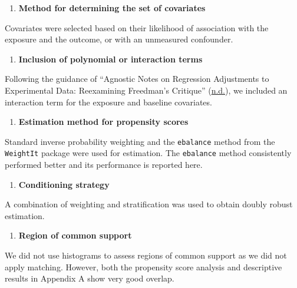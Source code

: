 \documentclass[
  singlecolumn]{report}
\providecommand{\tightlist}{%
  \setlength{\itemsep}{0pt}\setlength{\parskip}{0pt}}\usepackage{longtable,booktabs,array}
\begin{document}
\begin{enumerate}
\def\labelenumi{\arabic{enumi}.}
\setcounter{enumi}{2}
\tightlist
\item
  \textbf{Method for determining the set of covariates}
\end{enumerate}

Covariates were selected based on their likelihood of association with
the exposure and the outcome, or with an unmeasured confounder.

\begin{enumerate}
\def\labelenumi{\arabic{enumi}.}
\setcounter{enumi}{3}
\tightlist
\item
  \textbf{Inclusion of polynomial or interaction terms}
\end{enumerate}

Following the guidance of {``Agnostic Notes on Regression Adjustments to
Experimental Data: Reexamining Freedman{'}s Critique''}
(\protect\hyperlink{ref-agnostic}{n.d.}), we included an interaction
term for the exposure and baseline covariates.

\begin{enumerate}
\def\labelenumi{\arabic{enumi}.}
\setcounter{enumi}{4}
\tightlist
\item
  \textbf{Estimation method for propensity scores}
\end{enumerate}

Standard inverse probability weighting and the \texttt{ebalance} method
from the \texttt{WeightIt} package were used for estimation. The
\texttt{ebalance} method consistently performed better and its
performance is reported here.

\begin{enumerate}
\def\labelenumi{\arabic{enumi}.}
\setcounter{enumi}{4}
\tightlist
\item
  \textbf{Conditioning strategy}
\end{enumerate}

A combination of weighting and stratification was used to obtain doubly
robust estimation.

\begin{enumerate}
\def\labelenumi{\arabic{enumi}.}
\setcounter{enumi}{5}
\tightlist
\item
  \textbf{Region of common support}
\end{enumerate}

We did not use histograms to assess regions of common support as we did
not apply matching. However, both the propensity score analysis and
descriptive results in Appendix A show very good overlap.
\end{document}
